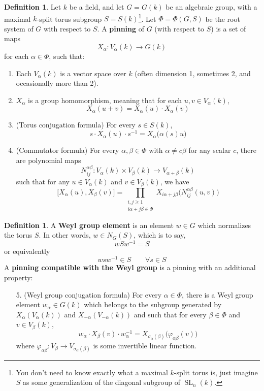 \documentclass[12pt]{article}
\theoremstyle{definition}
\newtheorem{definition}[theorem]{Definition}
\numberwithin{theorem}{subsection}
\newcommand{\sig}{\sigma}
\newcommand{\tbf}{\textbf}
\newcommand{\inv}{^{-1}}
\DeclareMathOperator{\SL}{SL}
\begin{document}
\begin{definition}
Let $k$ be a field, and let $G = G(k)$ be an algebraic group, with a maximal $k$-split torus subgroup $S = S(k)$\footnote{You don't need to know exactly what a maximal $k$-split torus is, just imagine $S$ as some generalization of the diagonal subgroup of $\SL_n(k)$.}. Let $\Phi = \Phi(G,S)$ be the root system of $G$ with respect to $S$. A \tbf{pinning} of $G$ (with respect to $S$) is a set of maps
\[
	X_\alpha:V_\alpha(k) \to G(k)
\]
for each $\alpha \in \Phi$, such that:
\begin{enumerate}
	\item Each $V_\alpha(k)$ is a vector space over $k$ (often dimension 1, sometimes 2, and occasionally more than 2).
	\item $X_\alpha$ is a group homomorphism, meaning that for each $u,v \in V_\alpha(k)$,
	\[
		X_\alpha(u+ v) = X_\alpha(u) \cdot X_\alpha(v)
	\]
	\item (Torus conjugation formula) For every $s \in S(k)$, 
	\[
		s \cdot X_\alpha(u) \cdot s \inv = X_\alpha \Big( \alpha(s) u \Big)
	\]
	\item (Commutator formula) For every $\alpha, \beta \in \Phi$ with $\alpha \neq c \beta$ for any scalar $c$, there are polynomial maps
	\[
		N_{ij}^{\alpha \beta}:V_\alpha(k) \times V_\beta(k) \to V_{\alpha+\beta}(k)
	\]
	such that for any $u \in V_\alpha(k)$ and $v \in V_\beta(k)$, we have
	\[
		\Big[ X_\alpha(u), X_\beta(v) \Big] = \prod_{\substack{i, j \ge 1 \\ i\alpha+j\beta \in \Phi}} X_{i \alpha+j\beta} \Big( N_{ij}^{\alpha \beta}(u,v) \Big)
	\]
\end{enumerate}
\end{definition}

\begin{definition}
A \tbf{Weyl group element} is an element $w \in G$ which normalizes the torus $S$. In other words, $w \in N_G(S)$, which is to say,
\[
	w S w \inv = S
\]
or equivalently
\[
	w s w \inv \in S \qquad \forall s \in S
\]
A \tbf{pinning compatible with the Weyl group} is a pinning with an additional property:
\begin{enumerate}
	\item[5.] (Weyl group conjugation formula) For every $\alpha \in \Phi$, there is a Weyl group element $w_\alpha \in G(k)$ which belongs to the subgroup generated by $X_\alpha(V_\alpha(k))$ and $X_{-\alpha}(V_{-\alpha}(k))$ and such that for every $\beta \in \Phi$ and $v \in V_\beta(k)$, 
	\[
		w_\alpha \cdot X_\beta(v) \cdot w_\alpha \inv = X_{\sig_\alpha(\beta)} \Big( \varphi_{\alpha \beta} (v) \Big)
	\]
	where $\varphi_{\alpha \beta}:V_\beta \to V_{\sig_\alpha(\beta)}$ is some invertible linear function.
\end{enumerate}
\end{definition}
\end{document}
